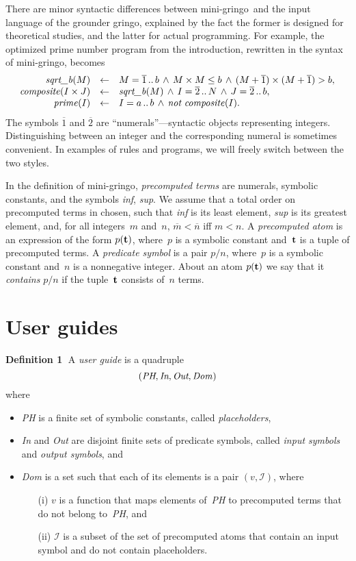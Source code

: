 \documentclass{article}
\def\ar{\leftarrow}
\def\beq{\begin{equation}}
\def\eeq#1{\label{#1}\end{equation}}
\def\ba{\begin{array}}
\def\ea{\end{array}}
\def\gringo{{\sc gringo}}
\def\num{\overline}
\newcommand{\I}{\mathcal{I}}
\begin{document}
There are minor syntactic differences between
mini-\gringo\ and the input language of the grounder \gringo,
explained by the fact the former is designed for theoretical studies, and the
latter for actual programming.
For example, the optimized prime number program from the introduction,
rewritten in the syntax of mini-\gringo, becomes
$$\ba {rcl}
\emph{sqrt\_b\/}(M) &\ar& M = \num  1\,..\,b \,\land\, M\times M \leq b
          \,\land\, (M+\num 1)\times(M+\num 1) > b,\\
          \emph{composite\/}(I\times J) &\ar& \emph{sqrt\_b\/}(M) \,\land\,
                 I = \num 2\,..\,N \,\land\, J = \num 2\,..\,b,\\
                 \emph{prime\/}(I) &\ar& I = a\,..\,b
                 \,\land\, \emph{not}\ \emph{composite\/}(I).
\ea
$$
The symbols $\num 1$ and $\num 2$ are ``numerals''---syntactic objects
representing integers. Distinguishing between an integer and the corresponding
numeral is sometimes convenient.  In examples of rules and programs, we will
freely switch between the two styles.

In the definition of mini-\gringo,
\emph{precomputed terms} are numerals,
  symbolic constants, and the symbols \emph{inf}, \emph{sup}.
  We assume that a total order on precomputed terms in chosen, such that
  \emph{inf} is its least element, \emph{sup} is its greatest element, and,
 for all integers~$m$ and~$n$,   $\num m < \num n$ iff $m<n$.
A  \emph{precomputed atom} is an expression of the form $p({\bf t})$, where~$p$
  is a symbolic constant and~$\bf t$ is a tuple of precomputed terms.
  A \emph{predicate symbol} is a pair $p/n$, where~$p$ is a symbolic
  constant and~$n$ is a nonnegative integer.  About an atom $p({\bf t})$ we
  say that it \emph{contains} $p/n$ if the tuple~$\bf t$ consists of~$n$
  terms.

\section{User guides}\label{sec:ug}

{\bf Definition 1}$\;$
A \emph{user guide} is a quadruple
\beq
(\emph{PH},\emph{In},\emph{Out},\emph{Dom\/})
\eeq{ug}
where
\begin{itemize}
\item \emph{PH} is a finite set of symbolic constants, called
  \emph{placeholders},
\item \emph{In} and \emph{Out} are disjoint finite sets of predicate
  symbols, called \emph{input symbols} and \emph{output symbols},
  and
\item \emph{Dom} is a set such that each of its elements is a pair $(v,\I)$,
  where
  \begin{itemize}
  \item [(i)]$v$ is a function that maps elements of~\emph{PH} to
      precomputed terms that do not belong to~\emph{PH}, and
    \item  [(ii)] $\I$ is a subset of the set of precomputed atoms that contain
      an input symbol and do not contain placeholders.
\end{itemize}
\end{itemize}
\end{document}
